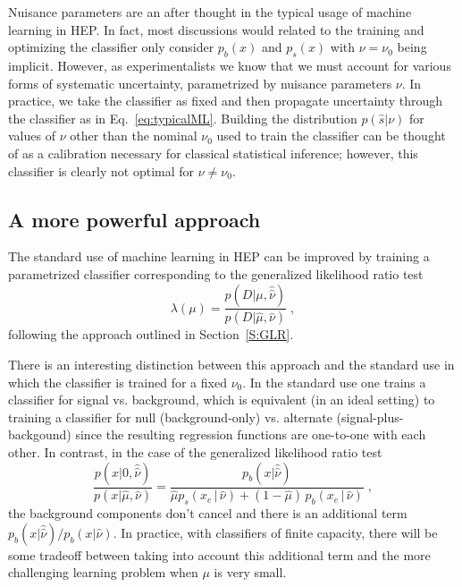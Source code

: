 \documentclass[12pt]{article}
\numberwithin{equation}{section}
\theoremstyle{plain}
\begin{document}
Nuisance parameters are an after thought in the typical usage of machine learning in HEP. In fact, most discussions would related to the training and optimizing the classifier only consider $p_b(x)$ and $p_s(x)$ with $\nu=\nu_0$ being implicit. However, as experimentalists we know that we must account for various forms of systematic uncertainty, parametrized by nuisance parameters $\nu$. In practice, we take the classifier as fixed and then propagate uncertainty through the classifier as in Eq.~\ref{eq:typicalML}. Building the distribution $p(\hat s|\nu)$ for values of $\nu$ other than the nominal $\nu_0$ used to train the classifier can be thought of as a calibration necessary for classical statistical inference; however, this classifier is clearly not optimal for $\nu \ne \nu_0$.

\subsection{A more powerful  approach}

The standard use of machine learning in HEP can be improved by training a parametrized classifier corresponding to the generalized likelihood ratio test
\begin{equation}
\lambda(\mu) = \frac{p(D|\mu, \hat{\hat{\nu}})}{p(D|\hat \mu, {\hat{\nu}})} \;,
\end{equation}
following the approach outlined in Section~\ref{S:GLR}.

There is an interesting distinction between this approach and the standard use in which the classifier is trained for a fixed $\nu_0$. In the standard use one trains a classifier for signal vs. background, which is equivalent (in an ideal setting) to training a classifier for  null (background-only) vs. alternate (signal-plus-backgound) since the resulting regression functions are one-to-one with each other.
In contrast, in the case of the generalized likelihood ratio test
\begin{equation}\label{eq:hep_improved}
 \frac{p(x| 0, \hat{\hat{ \nu}})}{p(x|\hat \mu, \hat\nu)} =  \frac{p_b(x| \hat{\hat{ \nu}})}{ \hat \mu p_s( x_e \, |\,  \hat\nu)  + (1- \hat \mu )\, p_b( x_e \,|\, \hat \nu)} \; ,
\end{equation}
the background components don't cancel and there is an additional term $p_b(x| \hat{\hat{ \nu}})/p_b(x| {\hat{ \nu}})$.
In practice, with classifiers of finite capacity, there will be some tradeoff between taking into account this additional term and the more challenging learning problem when $\mu$ is very small.
\end{document}
